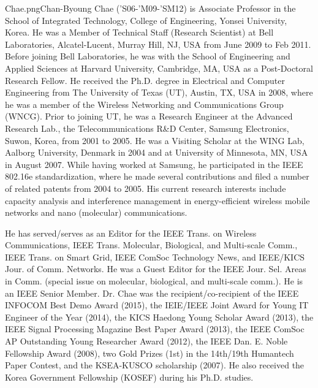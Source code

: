 \documentclass[10pt,twocolumn,twoside]{JCNtran}
\begin{document}
\epsfysize=2.9cm
\begin{biography}{Chae.png}{Chan-Byoung Chae}
('S06-'M09-'SM12) is Associate Professor in the School of Integrated Technology, College of Engineering, Yonsei University, Korea. He was a Member of Technical Staff (Research Scientist) at Bell Laboratories, Alcatel-Lucent, Murray Hill, NJ, USA from June 2009 to Feb 2011. Before joining Bell Laboratories, he was with the School of Engineering and Applied Sciences at Harvard University, Cambridge, MA, USA as a Post-Doctoral Research Fellow. He received the Ph.D. degree in Electrical and Computer Engineering from The University of Texas (UT), Austin, TX, USA in 2008, where he was a member of the Wireless Networking and Communications Group (WNCG). Prior to joining UT, he was a Research Engineer at the Advanced Research Lab., the Telecommunications R\&D Center, Samsung Electronics, Suwon, Korea, from 2001 to 2005. He was a Visiting Scholar at the WING Lab, Aalborg University, Denmark in 2004 and at University of Minnesota, MN, USA in August 2007. While having worked at Samsung, he participated in the IEEE 802.16e standardization, where he made several contributions and filed a number of related patents from 2004 to 2005. His current research interests include capacity analysis and interference management in energy-efficient wireless mobile networks and nano (molecular) communications. 

He has served/serves as an Editor for the IEEE Trans. on Wireless Communications, IEEE Trans. Molecular, Biological, and Multi-scale Comm., IEEE Trans. on Smart Grid, IEEE ComSoc Technology News, and IEEE/KICS Jour. of Comm. Networks. He was a Guest Editor for the IEEE Jour. Sel. Areas in Comm. (special issue on molecular, biological, and multi-scale comm.). He is an IEEE Senior Member.
Dr. Chae was the recipient/co-recipient of the IEEE INFOCOM Best Demo Award (2015), the IEIE/IEEE Joint Award for Young IT Engineer of the Year (2014), the KICS Haedong Young Scholar Award (2013), the IEEE Signal Processing Magazine Best Paper Award (2013), the IEEE ComSoc AP Outstanding Young Researcher Award (2012), the IEEE Dan. E. Noble Fellowship Award (2008), two Gold Prizes (1st) in the 14th/19th Humantech Paper Contest, and the KSEA-KUSCO scholarship (2007). He also received the Korea Government Fellowship (KOSEF) during his Ph.D. studies.
\end{biography}
\end{document}

